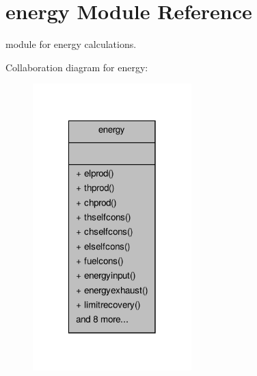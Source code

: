 \hypertarget{classenergy}{\section{energy Module Reference}
\label{classenergy}
}


module for energy calculations.  




Collaboration diagram for energy\-:
\nopagebreak
\begin{figure}[H]
\begin{center}
\leavevmode
\includegraphics[width=174pt]{classenergy__coll__graph}
\end{center}
\end{figure}
